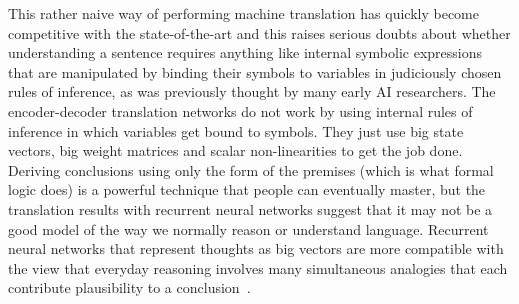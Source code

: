\documentclass[10pts]{article}
\begin{document}
This rather naive way of performing machine translation has quickly become
competitive with the state-of-the-art and this raises serious doubts about
whether understanding a sentence requires anything like internal symbolic
expressions that are manipulated by binding their symbols to variables
in judiciously chosen rules of inference, as was previously thought by
many early AI researchers.  The encoder-decoder translation
networks do not work by using internal rules of inference in which
variables get bound to symbols. They just use big state vectors, big weight
matrices and scalar non-linearities to get the job done.  
Deriving conclusions using only the form of the premises (which is
what formal logic does) is a powerful
technique that people can eventually master, but the translation
results with recurrent neural networks suggest that it may not be a good model of
the way we normally reason or understand language. Recurrent neural
networks that represent thoughts as big vectors are more compatible with
the view that everyday reasoning involves many simultaneous analogies that
each contribute plausibility to a 
conclusion~\citep{Lakoff+Johnson-2008,Rogers+McClelland-book2004}.
\end{document}
